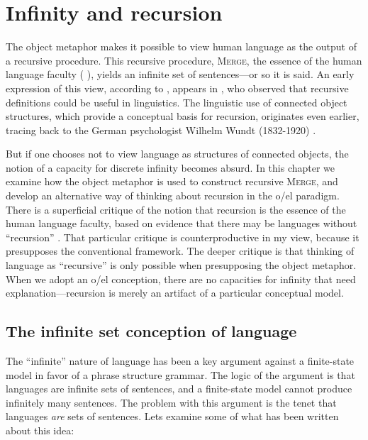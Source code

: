 \chapter{Infinity and recursion}

The object metaphor makes it possible to view human language as the output of a recursive procedure. This recursive procedure, \textsc{Merge}, the essence of the human language faculty (\citeauthor{Chomsky2001b} \citeyear*{Chomsky2001b,Chomsky2008}), yields an infinite set of sentences—or so it is said. An early expression of this view, according to \citet{Tomalin2007}, appears in \citet{Bar-Hillel1953recursive}, who observed that recursive definitions could be useful in linguistics. The linguistic use of connected object structures, which provide a conceptual basis for recursion, originates even earlier, tracing back to the German psychologist Wilhelm Wundt (1832-1920) \citep{Seuren1998}.

  But if one chooses not to view language as structures of connected objects, the notion of a capacity for discrete infinity becomes absurd. In this chapter we examine how the object metaphor is used to construct recursive \textsc{Merge}, and develop an alternative way of thinking about recursion in the o/el paradigm. There is a superficial critique of the notion that recursion is the essence of the human language faculty, based on evidence that there may be languages without “recursion” \citep{Everett2005}. That particular critique is counterproductive in my view, because it presupposes the conventional framework. The deeper critique is that thinking of language as “recursive” is only possible when presupposing the object metaphor. When we adopt an o/el conception, there are no capacities for infinity that need explanation—recursion is merely an artifact of a particular conceptual model.

\section{The infinite set conception of language}

The “infinite” nature of language has been a key argument against a finite-state model in favor of a phrase structure grammar. The logic of the argument is that languages are infinite sets of sentences, and a finite-state model cannot produce infinitely many sentences. The problem with this argument is the tenet that languages \textit{are} sets of sentences. Lets examine some of what has been written about this idea:  


